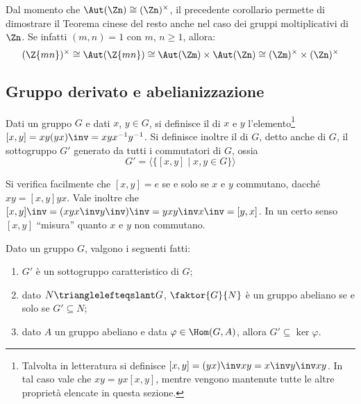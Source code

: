 \documentclass[11pt]{scrartcl}
\begin{document}
	\begin{remark}
		Dal momento che $\Aut(\Zn) \cong (\Zn)^\times$, il precedente
		corollario permette di dimostrare il Teorema cinese del resto anche
		nel caso dei gruppi moltiplicativi di $\Zn$. Se infatti $(m, n) = 1$
		con $m$, $n \geq 1$, allora:
		\[ (\Z{mn})^\times \cong \Aut(\Z{mn}) \cong \Aut(\Zm) \times \Aut(\Zn) \cong (\Zm)^\times \times (\Zn)^\times \]
	\end{remark}
	
	\newpage
	
	\subsection{Gruppo derivato e abelianizzazione}
	
	\begin{definition}
		Dati un gruppo $G$ e dati $x$, $y \in G$, si definisce il 
		di $x$ e $y$ l'elemento\footnote{
			Talvolta in letteratura si definisce $[x, y] = (yx)\inv xy = x\inv y\inv x y$. In
			tal caso vale che $xy = yx[x, y]$, mentre vengono mantenute tutte le
			altre proprietà elencate in questa sezione.
		} $[x, y] = xy(yx)\inv = xyx^{-1}y^{-1}$. Si definisce inoltre
		il  di $G$, detto anche  di $G$,
		il sottogruppo $G'$ generato da tutti i commutatori di $G$, ossia
		\[
		G' = \langle\{[x, y]\mid x, y \in G\}\rangle
		\]
	\end{definition}
	
	\begin{remark}
		Si verifica facilmente che $[x, y] = e$ se e solo se $x$ e $y$ commutano, dacché
		$xy = [x, y]yx$. Vale inoltre che $[x, y]\inv = (xyx\inv y\inv)\inv = yxy\inv x\inv =
		[y, x]$. In un certo senso $[x, y]$ ``misura'' quanto $x$ e $y$ non commutano.
	\end{remark}
	
	\begin{proposition}
		\label{prop1.35}
		Dato un gruppo $G$, valgono i seguenti fatti:
		\begin{enumerate}[(1)]
			\item $G'$ è un sottogruppo caratteristico di $G$;
			\item dato $N \trianglelefteqslant G$, $\faktor{G}{N}$ è un gruppo abeliano se
			e solo se $G' \subseteq N$;
			\item dato $A$ un gruppo abeliano e data $\varphi \in \Hom(G, A)$,
			allora $G' \subseteq \ker\varphi$.
		\end{enumerate}
	\end{proposition}
	
\end{document}
